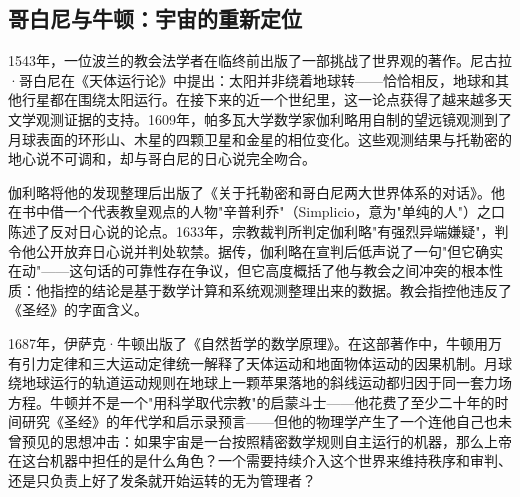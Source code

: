 \documentclass[a4paper,12pt]{ctexart}
\begin{document}
\subsection{哥白尼与牛顿：宇宙的重新定位}

1543年，一位波兰的教会法学者在临终前出版了一部挑战了世界观的著作。尼古拉·哥白尼在《天体运行论》中提出：太阳并非绕着地球转——恰恰相反，地球和其他行星都在围绕太阳运行。在接下来的近一个世纪里，这一论点获得了越来越多天文学观测证据的支持。1609年，帕多瓦大学数学家伽利略用自制的望远镜观测到了月球表面的环形山、木星的四颗卫星和金星的相位变化。这些观测结果与托勒密的地心说不可调和，却与哥白尼的日心说完全吻合。

伽利略将他的发现整理后出版了《关于托勒密和哥白尼两大世界体系的对话》。他在书中借一个代表教皇观点的人物"辛普利乔"（Simplicio，意为"单纯的人"）之口陈述了反对日心说的论点。1633年，宗教裁判所判定伽利略"有强烈异端嫌疑"，判令他公开放弃日心说并判处软禁。据传，伽利略在宣判后低声说了一句"但它确实在动"——这句话的可靠性存在争议，但它高度概括了他与教会之间冲突的根本性质：他指控的结论是基于数学计算和系统观测整理出来的数据。教会指控他违反了《圣经》的字面含义。

1687年，伊萨克·牛顿出版了《自然哲学的数学原理》。在这部著作中，牛顿用万有引力定律和三大运动定律统一解释了天体运动和地面物体运动的因果机制。月球绕地球运行的轨道运动规则在地球上一颗苹果落地的斜线运动都归因于同一套力场方程。牛顿并不是一个"用科学取代宗教"的启蒙斗士——他花费了至少二十年的时间研究《圣经》的年代学和启示录预言——但他的物理学产生了一个连他自己也未曾预见的思想冲击：如果宇宙是一台按照精密数学规则自主运行的机器，那么上帝在这台机器中担任的是什么角色？一个需要持续介入这个世界来维持秩序和审判、还是只负责上好了发条就开始运转的无为管理者？
\end{document}
